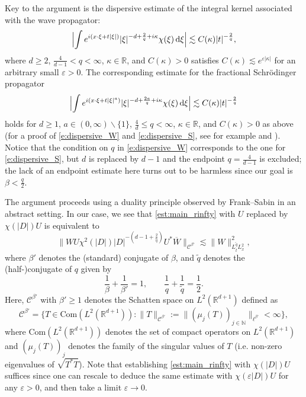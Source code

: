 \documentclass[a4paper]{amsart}
\numberwithin{equation}{section}%
\theoremstyle{plain}%
\theoremstyle{definition}
\theoremstyle{remark}%
\def\d{\mathrm{d}}
\def\C{\mathcal{C}}
\def\C{\mathcal{C}}
\newcommand{\R}{{\mathbb R}}
\newcommand{\N}{{\mathbb N}}
\begin{document}
Key to the argument is the dispersive estimate of the integral kernel associated with the wave propagator:
\begin{equation}
\label{e:dispersive_W}
    \Bigl|
\int e^{i(x \cdot\xi+t|\xi|)}|\xi|^{-d+\frac{2}{q}+ i \kappa} \chi(\xi) \,\d\xi
\Bigr|
\lesssim
C(\kappa)
|t|^{-\frac2q},
\end{equation}
where $d\geq2$, $\frac{4}{d-1}< q<\infty$, $\kappa\in\mathbb R$, and $C(\kappa)>0$ satisfies $C(\kappa) \lesssim e^{\varepsilon |\kappa|}$ for an arbitrary small $\varepsilon >0$. The corresponding estimate for the fractional Schr\"odinger propagator
\begin{equation}
\label{e:dispersive_S}
    \Bigl|
\int e^{i(x \cdot\xi+t|\xi|^a)}|\xi|^{-d+\frac{2a}{q}+ i \kappa} \chi(\xi) \,\d\xi
\Bigr|
\lesssim
C(\kappa)
|t|^{-\frac2q}
\end{equation}
holds for $d\geq1$,  $a\in(0,\infty)\backslash\{1\}$, $\frac{4}{d}\leq q<\infty$, $\kappa\in\mathbb R$, and $C(\kappa)>0$ as above (for a proof of \eqref{e:dispersive_W} and \eqref{e:dispersive_S}, see for example \cite{GPW} and \cite{GLNY}). Notice that the condition on $q$ in \eqref{e:dispersive_W} corresponds to the one for \eqref{e:dispersive_S}, but $d$ is replaced by $d-1$ and the endpoint $q=\frac{4}{d-1}$ is excluded; the lack of an endpoint estimate here turns out to be harmless since our goal is $\beta<\frac q2$. 

The argument proceeds using a duality principle observed by 
Frank--Sabin \cite[Lemma~3]{FS_AJM} in an abstract setting. In our case, we see that
\eqref{est:main_rinfty} with $U$ replaced by $\chi(|D|)U$ is equivalent to
\begin{equation}
    \label{est_main_Dual}
    \|WU\chi^2(|D|)|D|^{-(d-1+\frac{2}{\widetilde{q}})}U^*\overline{W}\|_{\C^{\beta'}}
\lesssim 
\|W\|_{L_t^{\widetilde{q}}L_x^{2}}^2,
\end{equation}
where $\beta'$ denotes the (standard) conjugate of $\beta$, and $\widetilde{q}$ denotes the (half-)conjugate of $q$ given by
\[
\frac1\beta+\frac{1}{\beta'}=1, \qquad \frac{1}{q}+\frac{1}{\widetilde{q}}=\frac12.
\]
Here, $\C^{\beta'}$ with $\beta' \geq 1$ denotes the Schatten space on $L^2(\mathbb R^{d+1})$ defined as
\[
\C^{\beta'}=\{T \in \mathrm{Com}(L^2(\R^{d+1})) : \|T\|_{\C^{\beta'}} := \|(\mu_j(T))_{j\in \N} \|_{\ell^{\beta'}} < \infty\},
\]
where $\mathrm{Com}(L^2(\R^{d+1}))$ denotes the set of compact operators on $L^2(\R^{d+1})$ and $(\mu_j(T))_j$ denotes the family of the singular values of $T$ (i.e. non-zero eigenvalues of $\sqrt{T^*T}$). Note that establishing \eqref{est:main_rinfty} with $\chi(|D|)U$ suffices since one can rescale to deduce the same estimate with $\chi(\varepsilon|D|)U$ for any $\varepsilon > 0$, and then take a limit $\varepsilon \to 0$.
\end{document}
